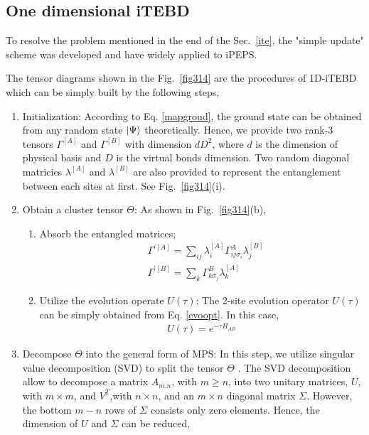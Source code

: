 \subsection{One dimensional iTEBD}
To resolve the problem mentioned in the end of the Sec.~\ref{ite}, the "simple update" scheme was developed and have widely applied to iPEPS. 

The tensor diagrams shown in the Fig.~\ref{fig314} are the procedures of 1D-iTEBD which can be simply built by the following steps,
\begin{enumerate}
	\item Initialization: According to Eq. \ref{mapgroud}, the ground state can be obtained from any random state $\Ket{\Psi}$ theoretically. Hence, we provide two rank-3 tensors $\Gamma^{[A]}$ and $\Gamma^{[B]}$ with dimension $dD^2$, where $d$ is the dimension of physical basis and $D$ is the virtual bonds dimension. Two random diagonal matricies $\lambda^{[A]}$ and $\lambda^{[B]}$ are also provided to represent the entanglement between each sites at first. See Fig.~\ref{fig314}(i).
	\item Obtain a cluster tensor $\Theta$: As shown in Fig.~\ref{fig314}(b),
		\begin{enumerate}
			\item Absorb the entangled matrices; 
				\begin{align}
					&\Gamma^{\prime [A]} = \sum_{ij}{\lambda^{[A]}_{i} \Gamma^{A}_{ij \sigma_i} \lambda^{[B]}_{j}} \\
					&\Gamma^{\prime [B]} = \sum_{k}{\Gamma^{B}_{k \sigma_j} \lambda^{[A]}_{k}}
				\end{align}
			\item Utilize the evolution operate $U(\tau)$: The 2-site evolution operator $U(\tau)$ can be simply obtained from Eq. \ref{evoopt}. In this case, 
				\begin{align}
					U(\tau) = e^{-\tau H_{AB}}
				\end{align}
		\end{enumerate}
	\item Decompose $\Theta$ into the general form of MPS: In this step, we utilize singular value decomposition (SVD) to split the tensor $\Theta$ . The SVD decomposition allow to decompose a matrix $A_{m.n}$, with $m \geq n$, into two unitary matrices, $U$, with $m \times m$, and $V^{T}$,with $n \times n$, and an $m \times n$ diagonal matrix $\Sigma$. However, the bottom $m - n$ rows of $\Sigma$ consists only zero elements. Hence, the dimension of $U$ and $\Sigma$ can be reduced,

\end{enumerate}

